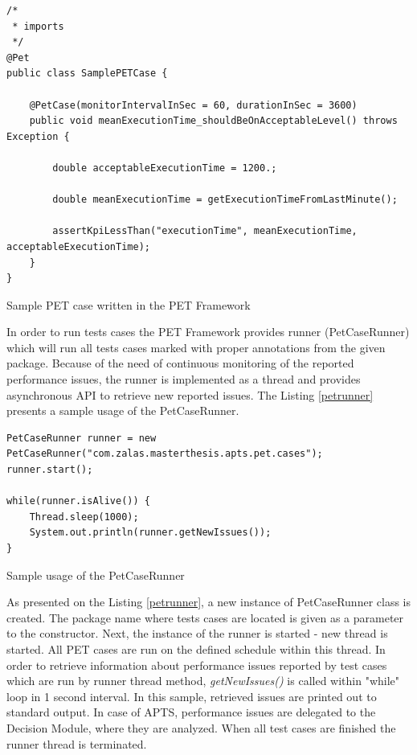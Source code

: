 \documentclass[12pt,a4paper]{article}
\begin{document}
\begin{listing}[ht]\begin{verbatim}
/*
 * imports
 */
@Pet
public class SamplePETCase {

    @PetCase(monitorIntervalInSec = 60, durationInSec = 3600)
    public void meanExecutionTime_shouldBeOnAcceptableLevel() throws Exception {
        
        double acceptableExecutionTime = 1200.;
        
        double meanExecutionTime = getExecutionTimeFromLastMinute();
        
        assertKpiLessThan("executionTime", meanExecutionTime, acceptableExecutionTime);
    }
}
\end{verbatim}
\caption{Sample PET case written in the PET Framework} \label{case}
\end{listing}

In order to run tests cases the PET Framework provides runner (PetCaseRunner) which will run all tests cases marked with proper annotations from the given package. Because of the need of continuous monitoring of the reported performance issues, the runner is implemented as a thread and provides asynchronous API to retrieve new reported issues. The Listing \ref{petrunner} presents a sample usage of the PetCaseRunner. 

\begin{listing}[ht]\begin{verbatim}
PetCaseRunner runner = new PetCaseRunner("com.zalas.masterthesis.apts.pet.cases");
runner.start();

while(runner.isAlive()) {
    Thread.sleep(1000);
    System.out.println(runner.getNewIssues());
}
\end{verbatim}
\caption{Sample usage of the PetCaseRunner} \label{petrunner}
\end{listing}

As presented on the Listing \ref{petrunner}, a new instance of PetCaseRunner class is created. The package name where tests cases are located is given as a parameter to the constructor. Next, the instance of the runner is started - new thread is started. All PET cases are run on the defined schedule within this thread. In order to retrieve information about performance issues reported by test cases which are run by runner thread method, \textit{getNewIssues()} is called within "while" loop in 1 second interval. In this sample,  retrieved issues are printed out to standard output. In case of APTS, performance issues are delegated to the Decision Module, where they are analyzed. When all test cases are finished the runner thread is terminated.    
\end{document}
